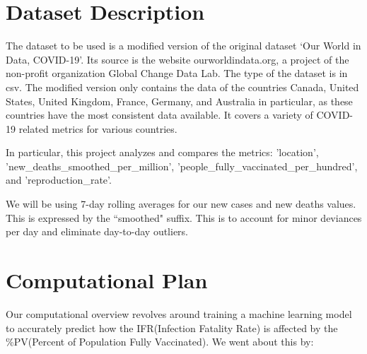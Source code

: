 \documentclass[fontsize=11pt]{article}
\begin{document}
  
\section*{Dataset Description}  

The dataset to be used is a modified version of the original dataset ‘Our World in Data, COVID-19’. Its source is the website ourworldindata.org, a project of the non-profit organization Global Change Data Lab. The type of the dataset is in csv. The modified version only contains the data of the countries Canada, United States, United Kingdom, France, Germany, and Australia in particular, as these countries have the most consistent data available. It covers a variety of COVID-19 related metrics for various countries. 

In particular, this project analyzes and compares the metrics: 'location', 'new\_deaths\_smoothed\_per\_million', 'people\_fully\_vaccinated\_per\_hundred', and 'reproduction\_rate'.
  
We will be using 7-day rolling averages for our new cases and new deaths values.   
This is expressed by the ``smoothed" suffix.   
This is to account for minor deviances per day and eliminate day-to-day outliers.  
\newpage  
  
  
  
\section*{Computational Plan}  
  
  
Our computational overview revolves around training a machine learning model to accurately predict how the IFR(Infection Fatality Rate) is affected by the \%PV(Percent of Population Fully Vaccinated). We went about this by:  
  
\end{document}
